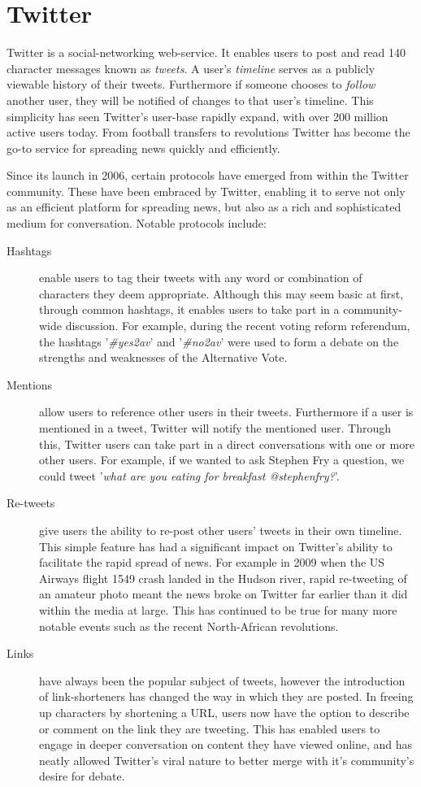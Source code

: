 \section{Twitter}
\label{background:twitter}

Twitter is a social-networking web-service. It enables users to post and read 140 character messages known as \emph{tweets}. A user's \emph{timeline} serves as a publicly viewable history of their tweets. Furthermore if someone chooses to \emph{follow} another user, they will be notified of changes to that user's timeline. This simplicity has seen Twitter's user-base rapidly expand, with over 200 million active users today. From football transfers to revolutions Twitter has become the go-to service for spreading news quickly and efficiently.

Since its launch in 2006, certain protocols have emerged from within the Twitter community. These have been embraced by Twitter, enabling it to serve not only as an efficient platform for spreading news, but also as a rich and sophisticated medium for conversation. Notable protocols include:

\begin{description}
	\item [Hashtags] enable users to tag their tweets with any word or combination of characters they deem appropriate. Although this may seem basic at first, through common hashtags, it enables users to take part in a community-wide discussion. For example, during the recent voting reform referendum, the hashtags '\emph{\#yes2av}' and '\emph{\#no2av}' were used to form a debate on the strengths and weaknesses of the Alternative Vote. 
	\item [Mentions] allow users to reference other users in their tweets. Furthermore if a user is mentioned in a tweet, Twitter will notify the mentioned user. Through this, Twitter users can take part in a direct conversations with one or more other users. For example, if we wanted to ask Stephen Fry a question, we could tweet '\emph{what are you eating for breakfast @stephenfry?}'.
	\item [Re-tweets] give users the ability to re-post other users' tweets in their own timeline. This simple feature has had a significant impact on Twitter's ability to facilitate the rapid spread of news. For example in 2009 when the US Airways flight 1549 crash landed in the Hudson river, rapid re-tweeting of an amateur photo meant the news broke on Twitter far earlier than it did within the media at large. This has continued to be true for many more notable events such as the recent North-African revolutions.
	\item [Links] have always been the popular subject of tweets, however the introduction of link-shorteners has changed the way in which they are posted. In freeing up characters by shortening a URL, users now have the option to describe or comment on the link they are tweeting. This has enabled users to engage in deeper conversation on content they have viewed online, and has neatly allowed Twitter's viral nature to better merge with it's community's desire for debate.
\end{description}

